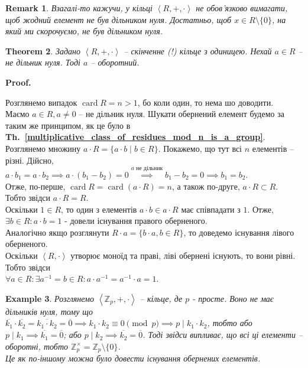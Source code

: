 \documentclass[a4paper, 10pt]{article}
\makeatletter
\theoremstyle{theoremdd}
\newtheorem{theorem}{Theorem}[subsection]
\theoremstyle{theoremdd}
\theoremstyle{theoremdd}
\theoremstyle{theoremdd}
\theoremstyle{theoremdd}
\newtheorem{example}[theorem]{Example}
\theoremstyle{theoremdd}
\theoremstyle{theoremdd}
\theoremstyle{theoremdd}
\theoremstyle{theoremdd}
\theoremstyle{theoremdd}
\theoremstyle{theoremdd}
\newtheorem{remark}[theorem]{Remark}
\theoremstyle{theoremdd}
\theoremstyle{theoremdd}
\theoremstyle{theoremdd}
\theoremstyle{theoremdd}
\renewenvironment{proof}[1][Proof.\\]{\par
\pushQED{\hfill \qed}%
\normalfont \topsep6\p@\@plus6\p@\relax
\trivlist
\item\relax
{\bfseries
#1\@addpunct{.}}\hspace\labelsep\ignorespaces
}{%
\popQED\endtrivlist\@endpefalse
}
\DeclareMathOperator{\card}{card}
\newcommand\thref[1]{\textbf{Th.~\ref{#1}}}
\makeatother
\begin{document}
\begin{remark}
Взагалі-то кажучи, у кільці $\left<R, +, \cdot\right>$ не обов'язково вимагати, щоб жодний елемент не був дільником нуля. Достатньо, щоб $x \in R \setminus \{0\}$, на який ми скорочуємо, не був дільником нуля.
\end{remark}

\begin{theorem}
\label{in_finite_ring_non_zero_divisors_are_inverses}
Задано $\left<R,+,\cdot \right>$ -- скінченне (!) кільце з одиницею. Нехай $a \in R$ -- не дільник нуля. Тоді $a$ -- оборотний.
\end{theorem}

\begin{proof}
Розглянемо випадок $\card R = n > 1$, бо коли один, то нема шо доводити.\\
Маємо $a \in R, a \neq 0$ -- не дільник нуля. Шукати обернений елемент будемо за таким же принципом, як це було в \thref{multiplicative_class_of_residues_mod_n_is_a_group}.\\
Розглянемо множину $a \cdot R = \{a \cdot b \mid b \in R\}$. Покажемо, що тут всі $n$ елементів -- різні. Дійсно,\\
$a \cdot b_1 = a \cdot b_2 \implies a \cdot (b_1-b_2) = 0 \overset{a \text{ не дільник}}{\implies} b_1-b_2 = 0 \implies b_1 = b_2$.\\
Отже, по-перше, $\card R = \card(a \cdot R) = n$, а також по-друге, $a \cdot R \subset R$.\\
Тобто звідси $a \cdot R = R$.\\
Оскільки $1 \in R$, то один з елементів $a \cdot b \in a \cdot R$ має співпадати з $1$. Отже, $\exists b \in R: a \cdot b = 1$ - довели існування правого оберненого.\\
Аналогічно якщо розглянути $R \cdot a = \{b \cdot a, b \in R \}$, то доведемо існування лівого оберненого.\\
Оскільки $\left<R, \cdot \right>$ утворює моноїд та праві, ліві обернені існують, то вони рівні. Тобто звідси\\
$\forall a \in R: \exists a^{-1} = b \in R: a \cdot a^{-1} = a^{-1} \cdot a = 1$.
\end{proof}

\begin{example}
Розглянемо $\left<\mathbb{Z}_p, +, \cdot \right>$ -- кільце, де $p$ - просте. Воно не має дільників нуля, тому що\\
$\overline{k_1} \cdot \overline{k_2} = \overline{k_1 \cdot k_2} = \overline{0} \implies k_1 \cdot k_2 \equiv 0 \pmod p \implies p \mid k_1 \cdot k_2$, тобто або $p \mid k_1 \implies \overline{k_1} = \overline{0}$; або $p \mid k_2 \implies \overline{k_2} = \overline{0}$. Тоді звідси випливає, що всі ці елементи -- оборотні, тобто $\mathbb{Z}_p^\times = \mathbb{Z}_p \setminus \{0\}$.\\
\textit{Це як по-іншому можна було довести існування обернених елементів.}
\end{example}
\end{document}
